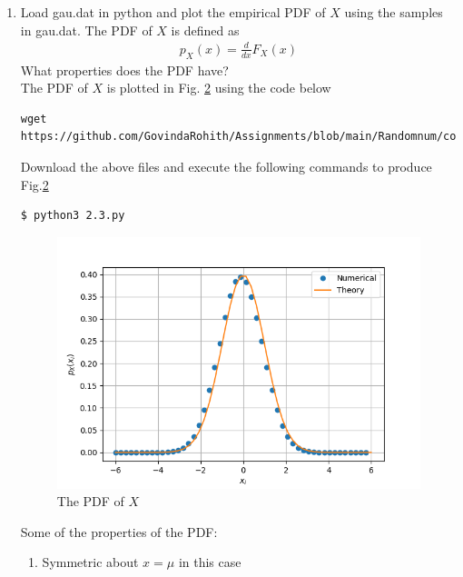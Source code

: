 \documentclass[journal,12pt,twocolumn]{IEEEtran}
\renewcommand\thesection{\arabic{section}}
\begin{document}
\begin{enumerate}[label=\thesection.\arabic*
,ref=\thesection.\theenumi]
\begin{figure}[!h]
\caption{The CDF of $X$}
\label{fig:2.2}
\end{figure}
Some of the properties of CDF 
\begin{enumerate}
\item $\lim_{x \to \infty}F_X(x) = 1$
    \item $F_X(x)$ is non decreasing function.
    \item Symmetric about one point.
\end{enumerate}
\item
Load gau.dat in python and plot the empirical PDF of $X$ using the samples in gau.dat. The PDF of $X$ is defined as
\begin{align}
p_{X}(x) = \frac{d}{dx}F_{X}(x)
\end{align}
What properties does the PDF have?
\\
\solution The PDF of $X$ is plotted in Fig. \ref{fig:2.3} using the code below
\begin{lstlisting}
wget https://github.com/GovindaRohith/Assignments/blob/main/Randomnum/codes/2.3.py
\end{lstlisting}
Download the above files and execute the following commands to produce Fig.\ref{fig:2.3}
\begin{lstlisting}
$ python3 2.3.py
\end{lstlisting}
\begin{figure}[!h]
\centering
\includegraphics[width=\columnwidth]{./figs/2.3.png}
\caption{The PDF of $X$}
\label{fig:2.3}
\end{figure}
Some of the properties of the PDF:
\begin{enumerate}
    \item Symmetric about $x=\mu$ in this case

\end{enumerate}
\end{enumerate}
\end{document}
